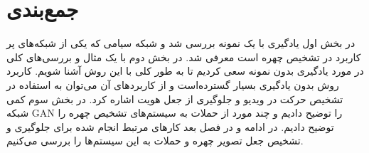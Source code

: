 \section{جمع‌بندی}\label{sec:جمع‌بندی}
در بخش اول یادگیری با یک نمونه بررسی شد و شبکه سیامی که یکی از شبکه‌های پر کاربرد در تشخیص چهره است معرفی شد. در بخش دوم با یک مثال و بررسی‌های کلی در مورد یادگیری بدون نمونه سعی کردیم تا به طور کلی با این روش آشنا شویم. کاربرد روش بدون یادگیری بسیار گسترده‌است و از کاربرد‌های آن می‌توان به استفاده در تشخیص حرکت در ویدیو و جلوگیری از جعل هویت اشاره کرد. در بخش سوم کمی شبکه GAN را توضیح دادیم و چند مورد از حملات به سیستم‌های تشخیص چهره را توضیح دادیم. در ادامه و در فصل بعد کار‌های مرتبط انجام شده برای جلوگیری و تشخیص جعل تصویر چهره و حملات به این سیستم‌ها را بررسی می‌کنیم.
